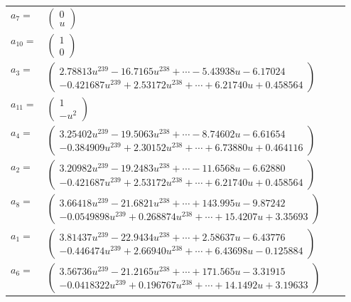 \documentclass[1p]{elsarticle_modified}
\theoremstyle{definition}
\begin{document}
\begin{tabular}{m{7pt} m{180pt} m{7pt} m{180pt} }
\flushright $a_{7}=$&$\begin{pmatrix}0\\u\end{pmatrix}$ \\
\flushright $a_{10}=$&$\begin{pmatrix}1\\0\end{pmatrix}$ \\
\flushright $a_{3}=$&$\begin{pmatrix}2.78813 u^{239}-16.7165 u^{238}+\cdots-5.43938 u-6.17024\\-0.421687 u^{239}+2.53172 u^{238}+\cdots+6.21740 u+0.458564\end{pmatrix}$ \\
\flushright $a_{11}=$&$\begin{pmatrix}1\\- u^2\end{pmatrix}$ \\
\flushright $a_{4}=$&$\begin{pmatrix}3.25402 u^{239}-19.5063 u^{238}+\cdots-8.74602 u-6.61654\\-0.384909 u^{239}+2.30152 u^{238}+\cdots+6.73880 u+0.464116\end{pmatrix}$ \\
\flushright $a_{2}=$&$\begin{pmatrix}3.20982 u^{239}-19.2483 u^{238}+\cdots-11.6568 u-6.62880\\-0.421687 u^{239}+2.53172 u^{238}+\cdots+6.21740 u+0.458564\end{pmatrix}$ \\
\flushright $a_{8}=$&$\begin{pmatrix}3.66418 u^{239}-21.6821 u^{238}+\cdots+143.995 u-9.87242\\-0.0549898 u^{239}+0.268874 u^{238}+\cdots+15.4207 u+3.35693\end{pmatrix}$ \\
\flushright $a_{1}=$&$\begin{pmatrix}3.81437 u^{239}-22.9434 u^{238}+\cdots+2.58637 u-6.43776\\-0.446474 u^{239}+2.66940 u^{238}+\cdots+6.43698 u-0.125884\end{pmatrix}$ \\
\flushright $a_{6}=$&$\begin{pmatrix}3.56736 u^{239}-21.2165 u^{238}+\cdots+171.565 u-3.31915\\-0.0418322 u^{239}+0.196767 u^{238}+\cdots+14.1492 u+3.19633\end{pmatrix}$ \\

\end{tabular}
\end{document}
